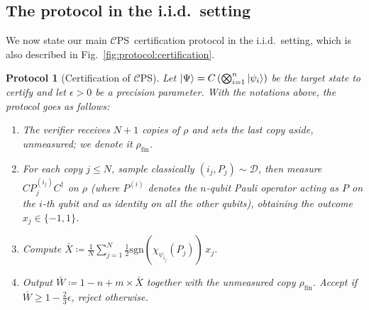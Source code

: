 \documentclass[a4paper,twocolumn,11pt,unpublished]{quantumarticle}
\newtheorem{protocol}{Protocol}
\newcommand{\np}{m}
\newcommand{\CEPS}{$\mathcal C$PS}
\newcommand{\pdist}{\mathcal D} %
\newcommand{\copyindex}{j}
\newcommand{\qubit}{i}
\begin{document}
            
\subsection{The protocol in the i.i.d.\ setting}
\label{subsection:iid}


 
            We now state our main \CEPS\ certification protocol in the i.i.d.\ setting, which is also described in Fig.~\ref{fig:protocol:certification}.


        


        \begin{protocol}[Certification of \CEPS]
            \label{protocol:certification}
            Let $\ket\Psi = C\left(\bigotimes_{\qubit=1}^n\ket{\psi_\qubit}\right)$ be the target state to certify and let $\epsilon>0$ be a precision parameter. With the notations above, the protocol goes as follows:
            \begin{enumerate}
                \item The verifier receives $N+1$ copies of $\rho$ and sets the last copy aside, unmeasured; we denote it $\rho_{\mathrm{fin}}$.
                \item For each copy $\copyindex\leq N$, sample classically $(\qubit_j, P_j)\sim \pdist$, then measure $C P_j^{(i_j)} C^\dagger$ on $\rho$ (where $P^{(i)}$ denotes the $n$-qubit Pauli operator acting as $P$ on the $i$-th qubit and as identity on all the other qubits), obtaining the outcome $x_j\in\{-1, 1\}$.
                \item Compute $\bar X \coloneqq \frac{1}{N}\sum_{\copyindex=1}^N \tfrac 1 2 \mathrm{sgn}(\chi_{\psi_{\qubit_j}}(P_j)) \,x_j$.
                \item Output $\bar W\coloneqq 1-n+\np\times \bar X$ together with the unmeasured copy $\rho_{\mathrm{fin}}$. Accept if $\bar W\ge1-\frac23\epsilon$, reject otherwise.
            \end{enumerate}
        \end{protocol}
\end{document}
